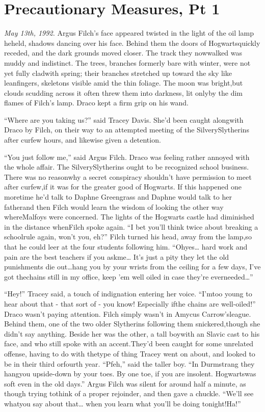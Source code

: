 \chapter{Precautionary Measures, Pt 1}

\emph{May 13th, 1992.}
Argus Filch's face appeared twisted in the light of the oil lamp heheld, shadows dancing over his face. Behind them the doors of Hogwartsquickly receded, and the dark grounds moved closer. The track they nowwalked was muddy and indistinct.
The trees, branches formerly bare with winter, were not yet fully cladwith spring; their branches stretched up toward the sky like leanfingers, skeletons visible amid the thin foliage. The moon was bright,but clouds scudding across it often threw them into darkness, lit onlyby the dim flames of Filch's lamp.
Draco kept a firm grip on his wand.

``Where are you taking us?'' said Tracey Davis. She'd been caught alongwith Draco by Filch, on their way to an attempted meeting of the SilverySlytherins after curfew hours, and likewise given a detention.

``You just follow me,'' said Argus Filch.
Draco was feeling rather annoyed with the whole affair. The SilverySlytherins ought to be recognized school business. There was no reasonwhy a secret conspiracy shouldn't have permission to meet after curfew,if it was for the greater good of Hogwarts. If this happened one moretime he'd talk to Daphne Greengrass and Daphne would talk to her fatherand then Filch would learn the wisdom of looking the other way whereMalfoys were concerned.
The lights of the Hogwarts castle had diminished in the distance whenFilch spoke again. ``I bet you'll think twice about breaking a schoolrule again, won't you, eh?'' Filch turned his head, away from the lamp,so that he could leer at the four students following him. ``Ohyes\ldots{} hard work and pain are the best teachers if you askme\ldots{} It's just a pity they let the old punishments die out\ldots{}hang you by your wrists from the ceiling for a few days, I've got thechains still in my office, keep 'em well oiled in case they're everneeded\ldots{}''

``Hey!'' Tracey said, a touch of indignation entering her voice. ``I'mtoo young to hear about that - that sort of - you know! Especially ifthe chains are well-oiled!''
Draco wasn't paying attention. Filch simply wasn't in Amycus Carrow'sleague.
Behind them, one of the two older Slytherins following them snickered,though she didn't say anything. Beside her was the other, a tall boywith an Slavic cast to his face, and who still spoke with an accent.They'd been caught for some unrelated offense, having to do with thetype of thing Tracey went on about, and looked to be in their third orfourth year. ``Pfeh,'' said the taller boy. ``In Durmstrang they hangyou upside-down by your toes. By one toe, if you are insolent. Hogwartswas soft even in the old days.''
Argus Filch was silent for around half a minute, as though trying tothink of a proper rejoinder, and then gave a chuckle. ``We'll see whatyou say about that\ldots{} when you learn what you'll be doing tonight!Ha!''

